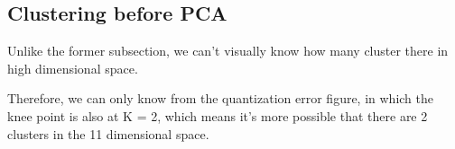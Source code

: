 \documentclass[titlepage,a4paper,12pt,thmsb]{report}
\begin{document}
\begin{center}
\begin{figure}[h]
{\par}
\end{figure}
{}
\end{center}


\newpage

\subsection{Clustering before PCA}
Unlike the former subsection, we can't visually know how many cluster there in high dimensional space.

Therefore, we can only know from the quantization error figure, in which the knee point is also at K = 2, which means it's more possible that there are 2 clusters in the 11 dimensional space.



\begin{center}
\begin{figure}[h]
{\par}
\end{figure}
{}
\end{center}

\newpage

\begin{center}
\begin{figure}[h]
{\par}
\end{figure}
{}
\end{center}



\begin{center}
\begin{figure}[h]
{\par}
\end{figure}
{}
\end{center}
\newpage

\begin{center}
\begin{figure}[h]
{\par}
\end{figure}
{}
\end{center}
\end{document}
